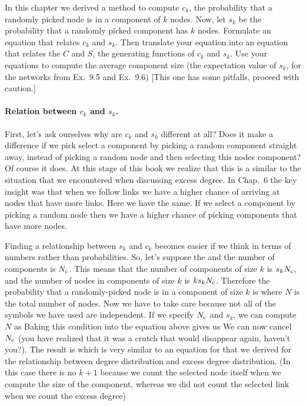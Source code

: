 In this chapter we derived a method to compute $c_k$, the probability 
that a randomly picked node is in a component of $k$ nodes. Now, let $s_k$ be the probability that a randomly picked component has $k$ nodes. Formulate an equation that relates $c_k$ and $s_k$. Then translate your equation into an equation that relates the $C$ and $S$, the generating functions of $c_k$ and $s_k$. Use your equations to compute the average component size (the expectation value of $s_k$, for the networks from Ex.~9.5 and Ex.~9.6) [This one has some pitfalls, proceed with caution.]

\solution 
\paragraph{Relation between $c_k$ and $s_k$.}First, let's ask ourselves why are $c_k$ and $s_k$ different at all?
Does it make a difference if we pick select a component by picking a random component straight away, instead of picking a random node and then selecting this nodes component? Of course it does. At this stage of this 
book we realize that this is a similar to the situation that we encountered when discussing excess degree. In Chap.~6 the key insight was that when we follow links we have a higher chance of arriving at nodes that have more links. Here we have the same. If we select a component by picking a random node then we have a higher chance of picking components that have more nodes. 

Finding a relationship between $s_k$ and $c_k$ becomes easier if we think in terms of numbers rather than probabilities. So, let's suppose the and the number of components is $N_{\rm c}$. This means that the number of components of size $k$ is $s_kN_{\rm c}$, and the number of nodes in components of size $k$ is $ks_kN_{\rm c}$. Therefore the probability that a randomly-picked node is in a component of size $k$ is 
where $N$ is the total number of nodes. Now we have to take care because not all of the symbols we have used are independent. If we specify $N_{\rm c}$ and $s_k$, we can compute $N$ as 
Baking this condition into the equation above gives us
We can now cancel $N_{\rm c}$ (you have realized that it was a crutch that would disappear again, haven't you?). The result is 
which is very similar to an equation for that we derived for the relationship between degree distribution and excess degree distribution. 
(In this case there is no $k+1$ because we count the selected node itself
when we compute the size of the component, whereas we did not count the selected link when we count the excess degree)

